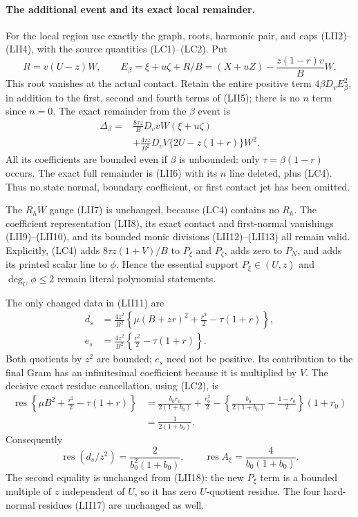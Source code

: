 \paragraph{The additional event and its exact local remainder.}
For the local region use exactly the graph, roots, harmonic pair,
and caps (LII2)--(LII4), with the source quantities (LC1)--(LC2).
Put
\[
 R=v(U-z)W,\qquad
 E_\beta=\xi+u\zeta+R/B
          =(X+uZ)-\frac{z(1-r)v}{B}W.                    \tag{LC3}
\]
This root vanishes at the actual contact.  Retain the entire
positive term $4\beta D_vE_\beta^2$, in addition to the first,
second and fourth terms of (LII5); there is no $n$ term since
$n=0$.  The exact remainder from the $\beta$ event is
\[
 \begin{split}
 \Delta_\beta={}&
 \frac{8\tau z}{B}D_vvW(\xi+u\zeta)\\
 &+\frac{4\tau z}{B^2}D_vV\{2U-z(1+r)\}W^2.
 \end{split}                                             \tag{LC4}
\]
All its coefficients are bounded even if $\beta$ is unbounded:
only $\tau=\beta(1-r)$ occurs.  The exact full remainder is (LII6)
with its $n$ line deleted, plus (LC4).  Thus no state normal,
boundary coefficient, or first contact jet has been omitted.

The $R_hW$ gauge (LII7) is unchanged, because (LC4) contains no
$R_h$.  The coefficient representation (LII8), its exact contact
and first-normal vanishings (LII9)--(LII10), and its bounded monic
divisions (LII12)--(LII13) all remain valid.  Explicitly, (LC4)
adds $8\tau z(1+V)/B$ to $P_\xi$ and $P_\zeta$, adds zero to
$P_N$, and adds its printed scalar line to $\phi$.  Hence the
essential support $P_\xi\in(U,z)$ and $\deg_U\phi\le2$ remain
literal polynomial statements.

The only changed data in (LII11) are
\[
\begin{split}
 d_s&=\frac{4z^2}{B^2}
   \left\{\mu(B+zr)^2+\frac{r^2}{2}-\tau(1+r)\right\},\\
 e_s&=\frac{4z^2}{B^2}
   \left\{\frac{r^2}{2}-\tau(1+r)\right\}.
\end{split}                                             \tag{LC5}
\]
Both quotients by $z^2$ are bounded; $e_s$ need not be positive.
Its contribution to the final Gram has an infinitesimal coefficient
because it is multiplied by $V$.  The decisive exact residue
cancellation, using (LC2), is
\[
 \begin{split}
 \operatorname{res}\left\{
 \mu B^2+\frac{r^2}{2}-\tau(1+r)\right\}
 &=\frac{b_0r_0}{2(1+b_0)}+\frac{r_0^2}{2}
 -\left\{\frac{b_0}{2(1+b_0)}-\frac{1-r_0}{2}\right\}(1+r_0)\\
 &=\frac1{2(1+b_0)}.
 \end{split}                                             \tag{LC6}
\]
Consequently
\[
 \operatorname{res}(d_s/z^2)=\frac2{b_0^2(1+b_0)},\qquad
 \operatorname{res}A_\xi=\frac4{b_0(1+b_0)}.              \tag{LC7}
\]
The second equality is unchanged from (LII18): the new $P_\xi$
term is a bounded multiple of $z$ independent of $U$, so it has
zero $U$-quotient residue.  The four hard-normal residues (LII17)
are unchanged as well.

